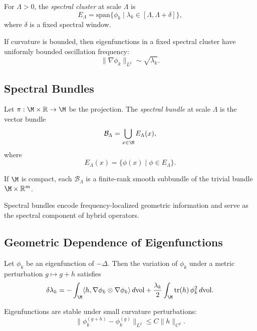 \begin{definition}
For $\Lambda > 0$, the \emph{spectral cluster} at scale $\Lambda$ is
\[
E_\Lambda = \mathrm{span}\{ \phi_k \mid \lambda_k \in [\Lambda, \Lambda + \delta] \},
\]
where $\delta$ is a fixed spectral window.
\end{definition}

\begin{lemma}
If curvature is bounded, then eigenfunctions in a fixed spectral cluster
have uniformly bounded oscillation frequency:
\[
\|\nabla \phi_k\|_{L^2} \sim \sqrt{\lambda_k}.
\]
\end{lemma}

\subsection{Spectral Bundles}

\begin{definition}
Let $\pi : \M \times \mathbb{R} \to \M$ be the projection.  
The \emph{spectral bundle} at scale $\Lambda$ is the vector bundle
\[
\mathcal{B}_\Lambda = \bigcup_{x \in \M} E_\Lambda(x),
\]
where
\[
E_\Lambda(x) = \{ \phi(x) \mid \phi \in E_\Lambda \}.
\]
\end{definition}

\begin{lemma}
If $\M$ is compact, each $\mathcal{B}_\Lambda$ is a finite-rank smooth
subbundle of the trivial bundle $\M \times \mathbb{R}^m$.
\end{lemma}

\begin{remark}
Spectral bundles encode frequency-localized geometric information and
serve as the spectral component of hybrid operators.
\end{remark}

\subsection{Geometric Dependence of Eigenfunctions}

\begin{theorem}
Let $\phi_k$ be an eigenfunction of $-\Delta$.  
Then the variation of $\phi_k$ under a metric perturbation $g \mapsto g+h$
satisfies
\[
\delta \lambda_k
= -\int_\M \langle h, \nabla \phi_k \otimes \nabla \phi_k \rangle
\, d\mathrm{vol}
+ \frac{\lambda_k}{2} \int_\M \mathrm{tr}(h)\, \phi_k^2\, d\mathrm{vol}.
\]
\end{theorem}

\begin{lemma}
Eigenfunctions are stable under small curvature perturbations:
\[
\|\phi_k^{(g+h)} - \phi_k^{(g)}\|_{L^2}
\le C \|h\|_{C^2}.
\]
\end{lemma}

